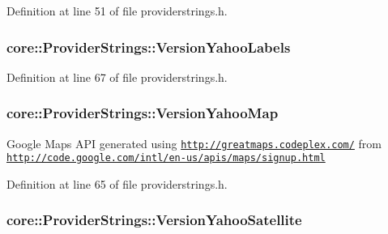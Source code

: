 Definition at line 51 of file providerstrings.\-h.

\hypertarget{group___o_p_map_widget_gae16013eddeb9d3b70af56f0e03eeab19}{
\subsubsection[{Version\-Yahoo\-Labels}]{ core\-::\-Provider\-Strings\-::\-Version\-Yahoo\-Labels}}\label{group___o_p_map_widget_gae16013eddeb9d3b70af56f0e03eeab19}


Definition at line 67 of file providerstrings.\-h.

\hypertarget{group___o_p_map_widget_ga3846cf6d2412f72a3c10be8d4066f7fc}{
\subsubsection[{Version\-Yahoo\-Map}]{ core\-::\-Provider\-Strings\-::\-Version\-Yahoo\-Map}}\label{group___o_p_map_widget_ga3846cf6d2412f72a3c10be8d4066f7fc}


Google Maps A\-P\-I generated using \href{http://greatmaps.codeplex.com/}{\tt http\-://greatmaps.\-codeplex.\-com/} from \href{http://code.google.com/intl/en-us/apis/maps/signup.html}{\tt http\-://code.\-google.\-com/intl/en-\/us/apis/maps/signup.\-html} 



Definition at line 65 of file providerstrings.\-h.

\hypertarget{group___o_p_map_widget_ga41e9afc6aa6f634642d2aaa246c1a60e}{
\subsubsection[{Version\-Yahoo\-Satellite}]{ core\-::\-Provider\-Strings\-::\-Version\-Yahoo\-Satellite}}\label{group___o_p_map_widget_ga41e9afc6aa6f634642d2aaa246c1a60e}


